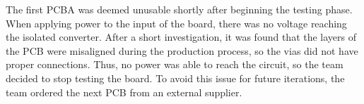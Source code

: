 The first PCBA was deemed unusable shortly after beginning the 
testing phase. When applying power to the input of the board, 
there was no voltage reaching the isolated converter. After a 
short investigation, it was found that the layers of the PCB 
were misaligned during the production process, so the vias did 
not have proper connections. Thus, no power was able to reach the 
circuit, so the team decided to stop testing 
the board. To avoid this issue for future iterations, the team 
ordered the next PCB from an external supplier. 